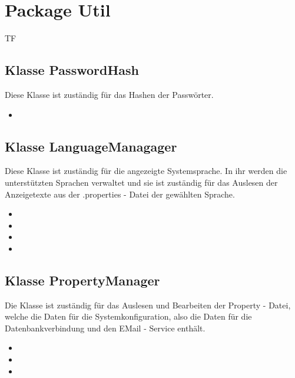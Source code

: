 	
	\section{Package Util}
	\begin{tiny}
		TF
	\end{tiny}
	\subsection{Klasse PasswordHash}
	Diese Klasse ist zuständig für das Hashen der Passwörter.
	\begin{itemize}
		\item {}
	\end{itemize}
	
	\subsection{Klasse LanguageManagager}
	Diese Klasse ist zuständig für die angezeigte Systemsprache. In ihr werden die unterstützten Sprachen verwaltet und sie ist zuständig für das Auslesen der Anzeigetexte aus der .properties - Datei der gewählten Sprache.
	\begin{itemize}
		\item {}
		\item {}
		\item {}
		\item {}
	\end{itemize}
	
	\subsection{Klasse PropertyManager}
	Die Klasse ist zuständig für das Auslesen und Bearbeiten der Property - Datei, welche die Daten für die Systemkonfiguration, also die Daten für die Datenbankverbindung und den EMail - Service enthält.
	\begin{itemize}
		\item {}
		\item {}
		\item {}
	\end{itemize}
	
